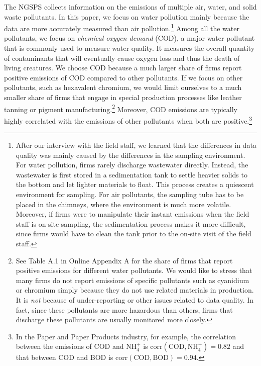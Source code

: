 \documentclass[AEJ]{AEA}
\begin{document}
The NGSPS collects information on the emissions of multiple air, water, and solid waste pollutants. In this paper, we focus on water pollution mainly because the data are more accurately measured than air pollution.\footnote{After our interview with the field staff, we learned that the differences in data quality was mainly caused by the differences in the sampling environment. For water pollution, firms rarely discharge wastewater directly. Instead, the wastewater is first stored in a sedimentation tank to settle heavier solids to the bottom and let lighter materials to float. This process creates a quiescent environment for sampling. For air pollutants, the sampling tube has to be placed in the chimneys, where the environment is much more volatile. Moreover, if firms were to manipulate their instant emissions when the field staff is on-site sampling, the sedimentation process makes it more difficult, since firms would have to clean the tank prior to the on-site visit of the field staff.} Among all the water pollutants, we focus on \textit{chemical oxygen demand} (COD), a major water pollutant that is commonly used to measure water quality. It measures the overall quantity of contaminants that will eventually cause oxygen loss and thus the death of living creatures. We choose COD because a much larger share of firms report positive emissions of COD compared to other pollutants. If we focus on other pollutants, such as hexavalent chromium, we would limit ourselves to a much smaller share of firms that engage in special production processes like leather tanning or pigment manufacturing.\footnote{See Table A.1 in Online Appendix A for the share of firms that report positive emissions for different water pollutants. We would like to stress that many firms do not report emissions of specific pollutants such as cyanidium or chromium simply because they do not use related materials in production. It is \textit{not} because of under-reporting or other issues related to data quality. In fact, since these pollutants are more hazardous than others, firms that discharge these pollutants are usually monitored more closely.} Moreover, COD emissions are typically highly correlated with the emissions of other pollutants when both are positive.\footnote{In the Paper and Paper Products industry, for example, the correlation between the emissions of COD and $\text{NH}_4^+$ is $\text{corr}(\text{COD},\text{NH}_4^+) = \text{0.82}$ and that between COD and BOD is $\text{corr}(\text{COD},\text{BOD}) = \text{0.94}$.}
\end{document}
